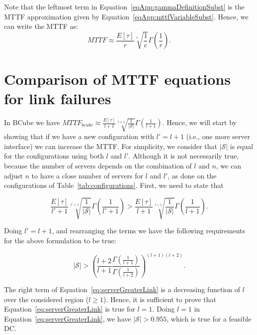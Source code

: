 Note that the leftmost term in Equation~\ref{eqApp:gammaDefinitionSubst} is the MTTF approximation given by Equation~\ref{eqApp:mttfVariableSubst}. 
Hence, we can write the MTTF as:
\begin{equation}
MTTF \approx \frac{E[\tau]}{r}\sqrt[r]{\frac{1}{c}} \Gamma \left (  \frac{1}{r} \right ).
\label{eqApp:mttfFinal}
\end{equation}

\section{Comparison of MTTF equations for link failures}
\label{app:compMTTFEquations}

In BCube we have $MTTF_{bcube} \approx \frac{E[\tau]}{l+1}\sqrt[l+1]{\frac{1}{|\mathcal{S}|}} \Gamma \left (  \frac{1}{l+1} \right )$. Hence, we will start by showing that if we have a new configuration with $l'=l+1$ (i.e., one more server interface) we can increase the MTTF. For simplicity, we consider that $|\mathcal{S}|$ is equal for the configurations using both $l$ and $l'$. Although it is not necessarily true, because the number of servers depends on the combination of $l$ and $n$, we can adjust $n$ to have a close number of servers for $l$ and $l'$, as done on the configurations of Table~\ref{tab:configurations}.
First, we need to state that

\begin{equation}
\frac{E[\tau]}{l'+1}\sqrt[l'+1]{\frac{1}{|\mathcal{S}|}} \Gamma \left (  \frac{1}{l'+1} \right ) > \frac{E[\tau]}{l+1}\sqrt[l+1]{\frac{1}{|\mathcal{S}|}} \Gamma \left (  \frac{1}{l+1} \right ).
\label{eq:statementLMTTF_link}
\end{equation}

Doing $l'=l+1$, and rearranging the terms we have the following requirements for the above formulation to be true:

\begin{equation}
|\mathcal{S}| > {\left ( \frac{l+2}{l+1} \frac{\Gamma \left (  \frac{1}{l+1} \right )}{\Gamma \left (  \frac{1}{l+2} \right )} \right)}^{(l+1)(l+2)}.
\label{eq:serverGreaterLink}
\end{equation}

The right term of Equation~\ref{eq:serverGreaterLink} is a decreasing function of $l$ over the considered region ($l \geq 1$). Hence, it is sufficient to prove that Equation~\ref{eq:serverGreaterLink} is true for $l=1$. Doing $l=1$ in Equation~\ref{eq:serverGreaterLink}, we have $|\mathcal{S}| > 0.955$, which is true for a feasible DC.

